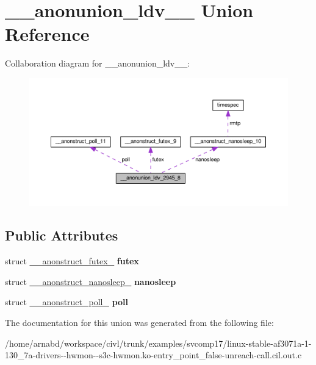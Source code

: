 \hypertarget{union____anonunion__ldv__2945__8}{}\section{\+\_\+\+\_\+anonunion\+\_\+ldv\+\_\+\_ Union Reference}
\label{union____anonunion__ldv__2945__8}


Collaboration diagram for \+\_\+\+\_\+anonunion\+\_\+ldv\+\_\+\_\+:
\nopagebreak
\begin{figure}[H]
\begin{center}
\leavevmode
\includegraphics[width=350pt]{union____anonunion__ldv__2945__8__coll__graph}
\end{center}
\end{figure}
\subsection*{Public Attributes}
\begin{DoxyCompactItemize}
\item 
\hypertarget{union____anonunion__ldv__2945__8_aec0c653fb8810319bdfb405aaa90eba0}{}struct \hyperlink{struct____anonstruct__futex__9}{\+\_\+\+\_\+anonstruct\+\_\+futex\+\_} {\bfseries futex}\label{union____anonunion__ldv__2945__8_aec0c653fb8810319bdfb405aaa90eba0}

\item 
\hypertarget{union____anonunion__ldv__2945__8_af99ff925bb79dc0e7c121e92f0b69005}{}struct \hyperlink{struct____anonstruct__nanosleep__10}{\+\_\+\+\_\+anonstruct\+\_\+nanosleep\+\_} {\bfseries nanosleep}\label{union____anonunion__ldv__2945__8_af99ff925bb79dc0e7c121e92f0b69005}

\item 
\hypertarget{union____anonunion__ldv__2945__8_a7fb0d90dae833bf959ebb6a1e17dffc6}{}struct \hyperlink{struct____anonstruct__poll__11}{\+\_\+\+\_\+anonstruct\+\_\+poll\+\_} {\bfseries poll}\label{union____anonunion__ldv__2945__8_a7fb0d90dae833bf959ebb6a1e17dffc6}

\end{DoxyCompactItemize}


The documentation for this union was generated from the following file\+:\begin{DoxyCompactItemize}
\item 
/home/arnabd/workspace/civl/trunk/examples/svcomp17/linux-\/stable-\/af3071a-\/1-\/130\+\_\+7a-\/drivers-\/-\/hwmon-\/-\/s3c-\/hwmon.\+ko-\/entry\+\_\+point\+\_\+false-\/unreach-\/call.\+cil.\+out.\+c\end{DoxyCompactItemize}
